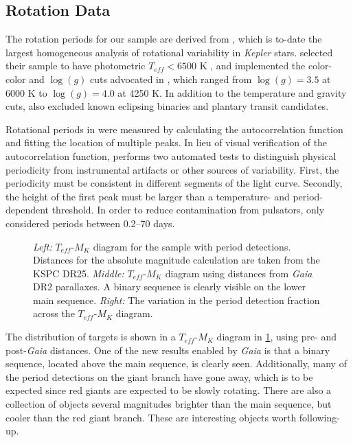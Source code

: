 \documentclass[manuscript]{aastex6}
\newcommand{\Kepler}{\mbox{\textit{Kepler}}}
\newcommand{\Gaia}{\mbox{\textit{Gaia}}}
\newcommand{\Teff}{\ensuremath{T_{eff}}}
\newcommand{\logg}{\ensuremath{\log(g)}}
\begin{document}
\subsection{Rotation Data}

The rotation periods for our sample are derived from \citet{McQuillan14}, 
which is to-date the largest homogeneous analysis of rotational variability in
\Kepler{} stars. \citet{McQuillan14} selected their sample to have photometric
\(\Teff < 6500\) K \citep{Brown11,Dressing13}, and implemented the color-color
and \logg{} cuts advocated in \citet{Ciardi11}, which ranged from \(\logg = 
3.5\) at 6000 K to \(\logg = 4.0\) at 4250 K. 
In addition to the temperature and gravity cuts, \citet{McQuillan14} also 
excluded known eclipsing binaries and plantary transit candidates. 

Rotational periods in \citet{McQuillan14} were measured by calculating the 
autocorrelation function and fitting the location of multiple peaks. In lieu 
of visual verification of the autocorrelation function, \citet{McQuillan14}
performs two automated tests to distinguish physical periodicity from
instrumental artifacts or other sources of variability. First, the 
periodicity must be consistent in different segments of the light curve.
Secondly, the height of the first peak must be larger than a temperature- and
period-dependent threshold. In order to reduce contamination from pulsators, 
\citet{McQuillan14} only considered periods between 0.2--70 days.

\begin{figure}[htb]
    \centering
    \caption{\emph{Left:} \Teff-\(M_K\) diagram for the \citet{McQuillan14}
    sample with period detections. Distances for the absolute magnitude
calculation are taken from the KSPC DR25. \emph{Middle:} \Teff-\(M_K\) diagram
using distances from \Gaia{} DR2 parallaxes. A binary sequence is clearly
visible on the lower main sequence. \emph{Right:} The variation in the 
\citet{McQuillan14} period detection fraction across the \Teff-\(M_K\) diagram. }
    \label{fig:mcquillan_selection}
\end{figure}

The distribution of \citet{McQuillan14} targets is shown in a \Teff-\(M_K\)
diagram in \cref{fig:mcquillan_selection}, using pre- and post-\Gaia{}
distances. One of the new results enabled by \Gaia{} is that a binary sequence,
located above the main sequence, is clearly seen. Additionally, many of the
period detections on the giant branch have gone away, which is to be expected
since red giants are expected to be slowly rotating. There are also a
collection of objects several magnitudes brighter than the main sequence, but
cooler than the red giant branch. These are interesting objects worth
following-up.
\end{document}

